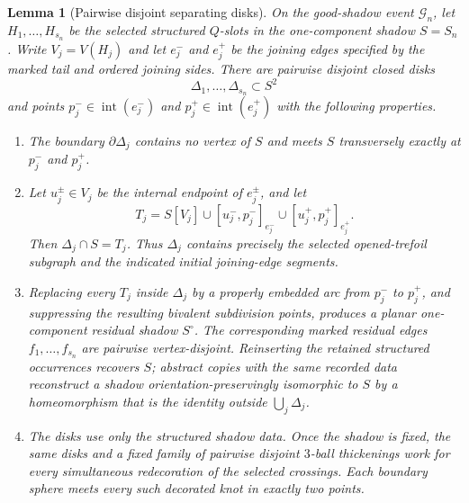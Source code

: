 \documentclass[9pt,twoside]{pnas-new}
\newtheorem{lemma}[theorem]{Lemma}
\theoremstyle{definition}
\theoremstyle{remark}
\begin{document}
\begin{lemma}[Pairwise disjoint separating disks]
\label{lem:simultaneous-separators}
On the good-shadow event $\mathcal G_n$, let $H_1,\ldots,H_{s_n}$ be the selected structured $Q$-slots in the one-component shadow $S=S_n$. Write $V_j=V(H_j)$ and let $e_j^-$ and $e_j^+$ be the joining edges specified by the marked tail and ordered joining sides. There are pairwise disjoint closed disks
\[
 \Delta_1,\ldots,\Delta_{s_n}\subset S^2
\]
and points $p_j^-\in\operatorname{int}(e_j^-)$ and $p_j^+\in\operatorname{int}(e_j^+)$ with the following properties.
\begin{enumerate}[label=(\roman*)]
\item The boundary $\partial\Delta_j$ contains no vertex of $S$ and meets $S$ transversely exactly at $p_j^-$ and $p_j^+$.
\item Let $u_j^\pm\in V_j$ be the internal endpoint of $e_j^\pm$, and let
\[
 T_j=S[V_j]\cup [u_j^-,p_j^-]_{e_j^-}\cup [u_j^+,p_j^+]_{e_j^+}.
\]
Then $\Delta_j\cap S=T_j$. Thus $\Delta_j$ contains precisely the selected opened-trefoil subgraph and the indicated initial joining-edge segments.
\item Replacing every $T_j$ inside $\Delta_j$ by a properly embedded arc from $p_j^-$ to $p_j^+$, and suppressing the resulting bivalent subdivision points, produces a planar one-component residual shadow $S^\circ$. The corresponding marked residual edges $f_1,\ldots,f_{s_n}$ are pairwise vertex-disjoint. Reinserting the retained structured occurrences recovers $S$; abstract copies with the same recorded data reconstruct a shadow orientation-preservingly isomorphic to $S$ by a homeomorphism that is the identity outside $\bigcup_j\Delta_j$.
\item The disks use only the structured shadow data. Once the shadow is fixed, the same disks and a fixed family of pairwise disjoint $3$-ball thickenings work for every simultaneous redecoration of the selected crossings. Each boundary sphere meets every such decorated knot in exactly two points.
\end{enumerate}
\end{lemma}
\end{document}
